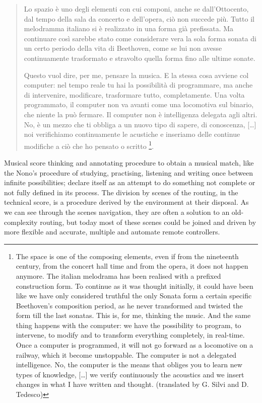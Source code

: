 \documentclass[twoside,a4paper]{article}
\begin{document}
\begin{quote}
Lo spazio è uno degli elementi con cui componi, anche se dall'Ottocento, dal tempo
della sala da concerto e dell'opera, ciò non succede più.
Tutto il melodramma italiano si è realizzato in una forma già prefissata. Ma
continuare così sarebbe stato come considerare vera la sola forma sonata di un
certo periodo della vita di Beethoven, come se lui non avesse continuamente
trasformato e stravolto quella forma fino alle ultime sonate.

Questo vuol dire, per me, pensare la musica. E la stessa cosa avviene col computer:
nel tempo reale tu hai la possibilità di programmare, ma anche di intervenire,
modificare, trasformare tutto, completamente. Una volta programmato, il computer
non va avanti come una locomotiva sul binario, che niente la può fermare. Il
computer non è intelligenza delegata agli altri. No, è un mezzo che ti obbliga a
un nuovo tipo di sapere, di conoscenza, [\ldots] %
noi verifichiamo continuamente le acustiche e inseriamo delle continue modifiche
a ciò che ho pensato o scritto \cite{nono84}\footnote{The space is one of the
composing elements, even if from the nineteenth century, from the concert hall
time and from the opera, it does not happen anymore. The italian melodrama has
been realised with a prefixed construction form. To continue as it was thought
initially, it could have been like we have only considered truthful the only
Sonata form a certain specific Beethoven's composition period, as he never
transformed and twisted the form till the last sonatas. This is, for me,
thinking the music. And the same thing happens with the computer: we have the
possibility to program, to intervene, to modify and to transform everything
completely, in real-time. Once a computer is programmed, it will not go forward
as a locomotive on a railway, which it become unstoppable. The computer is not a
delegated intelligence. No, the computer is the means that obliges you to learn
new types of knowledge, [\ldots] we verify continuously the acoustics and we
insert changes in what I have written and thought. (translated by G. Silvi and
D. Tedesco)}.
\end{quote}

Musical score thinking and annotating procedure to obtain a musical match, like
the Nono's procedure of studying, practising, listening and writing once between
infinite possibilities; declare itself as an attempt to do something not complete
or not fully defined in its process. The division by scenes of the routing, in
the technical score, is a procedure derived by the environment at their disposal.
As we can see through the scenes navigation, they are often a solution to an
old-complexity routing, but today most of these scenes could be joined and driven
by more flexible and accurate, multiple and automate remote controllers.
\end{document}
